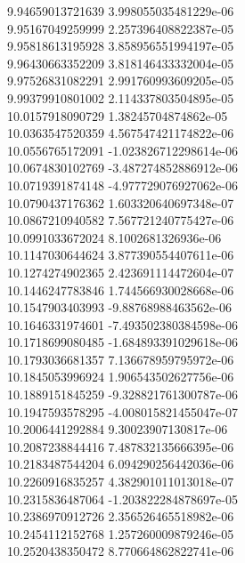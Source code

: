 {9.94659013721639 3.998055035481229e-06
 \\
9.95167049259999 2.257396408822387e-05
 \\
9.95818613195928 3.858956551994197e-05
 \\
9.96430663352209 3.818146433332004e-05
 \\
9.97526831082291 2.991760993609205e-05
 \\
9.99379910801002 2.114337803504895e-05
 \\
10.0157918090729 1.38245704874862e-05
 \\
10.0363547520359 4.567547421174822e-06
 \\
10.0556765172091 -1.023826712298614e-06
 \\
10.0674830102769 -3.487274852886912e-06
 \\
10.0719391874148 -4.977729076927062e-06
 \\
10.0790437176362 1.603320640697348e-07
 \\
10.0867210940582 7.567721240775427e-06
 \\
10.0991033672024 8.1002681326936e-06
 \\
10.1147030644624 3.877390554407611e-06
 \\
10.1274274902365 2.423691114472604e-07
 \\
10.1446247783846 1.744566930028668e-06
 \\
10.1547903403993 -9.88768988463562e-06
 \\
10.1646331974601 -7.493502380384598e-06
 \\
10.1718699080485 -1.684893391029618e-06
 \\
10.1793036681357 7.136678959795972e-06
 \\
10.1845053996924 1.906543502627756e-06
 \\
10.1889151845259 -9.328821761300787e-06
 \\
10.1947593578295 -4.008015821455047e-07
 \\
10.2006441292884 9.30023907130817e-06
 \\
10.2087238844416 7.487832135666395e-06
 \\
10.2183487544204 6.094290256442036e-06
 \\
10.2260916835257 4.382901011013018e-07
 \\
10.2315836487064 -1.203822284878697e-05
 \\
10.2386970912726 2.356526465518982e-06
 \\
10.2454112152768 1.257260009879246e-05
 \\
10.2520438350472 8.770664862822741e-06
}
